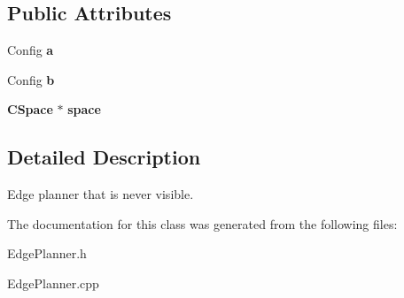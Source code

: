 \subsection*{Public Attributes}
\begin{DoxyCompactItemize}
\item 
Config {\bfseries a}\label{classFalseEdgePlanner_a862f456b32a8beacee24b16596a3cbb3}

\item 
Config {\bfseries b}\label{classFalseEdgePlanner_ae092fd61b7363c1204a2046bef5d0624}

\item 
{\bf C\+Space} $\ast$ {\bfseries space}\label{classFalseEdgePlanner_abe4989ed73d0d2c81595b571822a0de6}

\end{DoxyCompactItemize}


\subsection{Detailed Description}
Edge planner that is never visible. 

The documentation for this class was generated from the following files\+:\begin{DoxyCompactItemize}
\item 
Edge\+Planner.\+h\item 
Edge\+Planner.\+cpp\end{DoxyCompactItemize}
